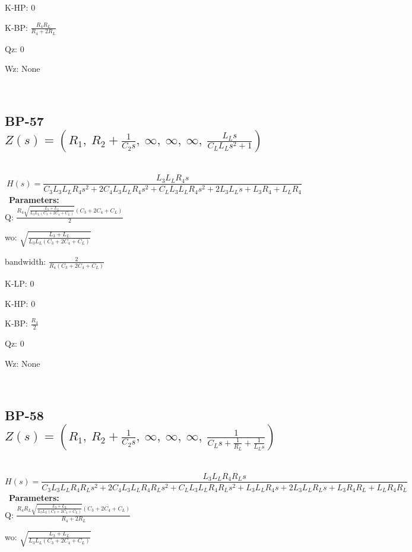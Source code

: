 \documentclass{article}
\begin{document}
K-HP: $0$\ 

K-BP: $\frac{R_{4} R_{L}}{R_{4} + 2 R_{L}}$\ 

Qz: $0$\ 

Wz: $\text{None}$\ 

\ 

\subsection{BP-57 $Z(s) = \left( R_{1}, \  R_{2} + \frac{1}{C_{2} s}, \  \infty, \  \infty, \  \infty, \  \frac{L_{L} s}{C_{L} L_{L} s^{2} + 1}\right)$ } \ 
\textbf{\[H(s) = \frac{L_{3} L_{L} R_{4} s}{C_{3} L_{3} L_{L} R_{4} s^{2} + 2 C_{4} L_{3} L_{L} R_{4} s^{2} + C_{L} L_{3} L_{L} R_{4} s^{2} + 2 L_{3} L_{L} s + L_{3} R_{4} + L_{L} R_{4}}\] } \ 
\textbf{Parameters:}\\ 

Q: $\frac{R_{4} \sqrt{\frac{L_{3} + L_{L}}{L_{3} L_{L} \left(C_{3} + 2 C_{4} + C_{L}\right)}} \left(C_{3} + 2 C_{4} + C_{L}\right)}{2}$\ 

wo: $\sqrt{\frac{L_{3} + L_{L}}{L_{3} L_{L} \left(C_{3} + 2 C_{4} + C_{L}\right)}}$\ 

bandwidth: $\frac{2}{R_{4} \left(C_{3} + 2 C_{4} + C_{L}\right)}$\ 

K-LP: $0$\ 

K-HP: $0$\ 

K-BP: $\frac{R_{4}}{2}$\ 

Qz: $0$\ 

Wz: $\text{None}$\ 

\ 

\subsection{BP-58 $Z(s) = \left( R_{1}, \  R_{2} + \frac{1}{C_{2} s}, \  \infty, \  \infty, \  \infty, \  \frac{1}{C_{L} s + \frac{1}{R_{L}} + \frac{1}{L_{L} s}}\right)$ } \ 
\textbf{\[H(s) = \frac{L_{3} L_{L} R_{4} R_{L} s}{C_{3} L_{3} L_{L} R_{4} R_{L} s^{2} + 2 C_{4} L_{3} L_{L} R_{4} R_{L} s^{2} + C_{L} L_{3} L_{L} R_{4} R_{L} s^{2} + L_{3} L_{L} R_{4} s + 2 L_{3} L_{L} R_{L} s + L_{3} R_{4} R_{L} + L_{L} R_{4} R_{L}}\] } \ 
\textbf{Parameters:}\\ 

Q: $\frac{R_{4} R_{L} \sqrt{\frac{L_{3} + L_{L}}{L_{3} L_{L} \left(C_{3} + 2 C_{4} + C_{L}\right)}} \left(C_{3} + 2 C_{4} + C_{L}\right)}{R_{4} + 2 R_{L}}$\ 

wo: $\sqrt{\frac{L_{3} + L_{L}}{L_{3} L_{L} \left(C_{3} + 2 C_{4} + C_{L}\right)}}$\ 
\end{document}
